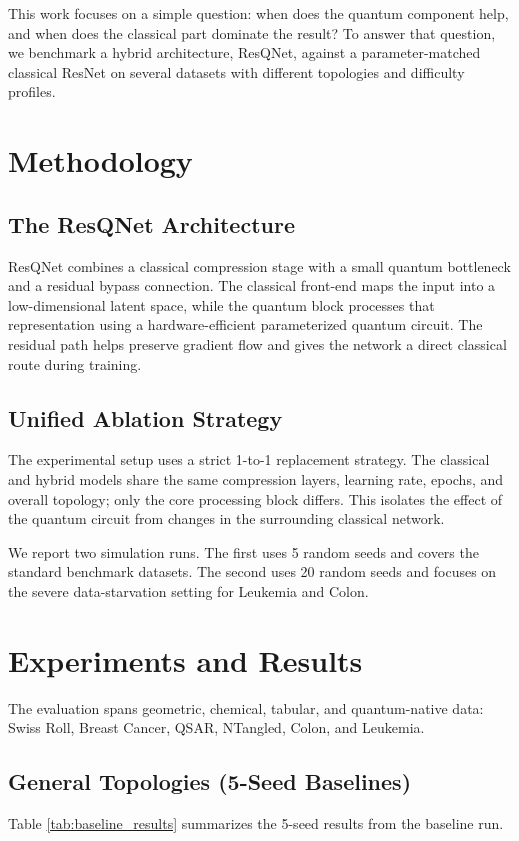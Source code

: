 \documentclass[conference]{IEEEtran}
\begin{document}
This work focuses on a simple question: when does the quantum component help, and when does the classical part dominate the result? To answer that question, we benchmark a hybrid architecture, ResQNet, against a parameter-matched classical ResNet on several datasets with different topologies and difficulty profiles.

\section{Methodology}
\subsection{The ResQNet Architecture}
ResQNet combines a classical compression stage with a small quantum bottleneck and a residual bypass connection. The classical front-end maps the input into a low-dimensional latent space, while the quantum block processes that representation using a hardware-efficient parameterized quantum circuit. The residual path helps preserve gradient flow and gives the network a direct classical route during training.

\subsection{Unified Ablation Strategy}
The experimental setup uses a strict 1-to-1 replacement strategy. The classical and hybrid models share the same compression layers, learning rate, epochs, and overall topology; only the core processing block differs. This isolates the effect of the quantum circuit from changes in the surrounding classical network.

We report two simulation runs. The first uses 5 random seeds and covers the standard benchmark datasets. The second uses 20 random seeds and focuses on the severe data-starvation setting for Leukemia and Colon.

\section{Experiments and Results}
The evaluation spans geometric, chemical, tabular, and quantum-native data: Swiss Roll, Breast Cancer, QSAR, NTangled, Colon, and Leukemia.

\subsection{General Topologies (5-Seed Baselines)}
Table \ref{tab:baseline_results} summarizes the 5-seed results from the baseline run.
\end{document}

